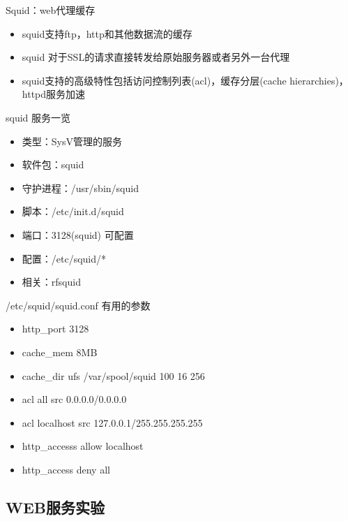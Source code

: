 \begin{frame}{Squid：web代理缓存}
\begin{itemize}
\item squid支持ftp，http和其他数据流的缓存
\item squid 对于SSL的请求直接转发给原始服务器或者另外一台代理
\item squid支持的高级特性包括访问控制列表(acl)，缓存分层(cache hierarchies)，httpd服务加速
\end{itemize}

\end{frame} 
\begin{frame}{squid 服务一览}
\begin{itemize}
\item 类型：SysV管理的服务
\item 软件包：squid
\item 守护进程：/usr/sbin/squid
\item 脚本：/etc/init.d/squid
\item 端口：3128(squid) 可配置
\item 配置：/etc/squid/{*}
\item 相关：rfsquid
\end{itemize}

\end{frame} 
\begin{frame}{/etc/squid/squid.conf 有用的参数}
\begin{itemize}
\item http\_port 3128
\item cache\_mem 8MB
\item cache\_dir ufs /var/spool/squid 100 16 256
\item acl all src 0.0.0.0/0.0.0.0
\item acl localhost src 127.0.0.1/255.255.255.255
\item http\_accesss allow localhost
\item http\_access deny all
\end{itemize}

\end{frame} 
\subsection{WEB服务实验}

